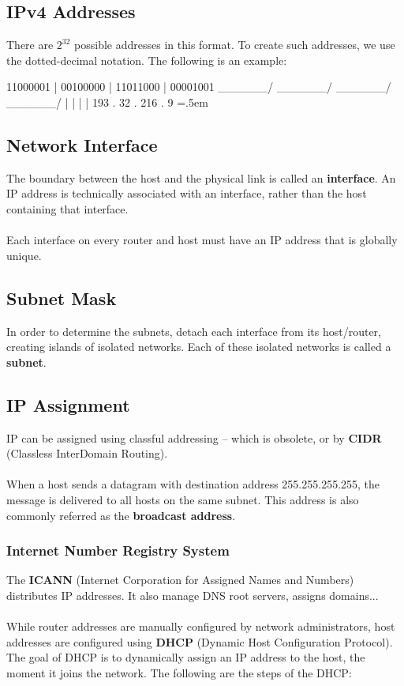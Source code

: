 \documentclass{article}
\newenvironment{cverbatim}
 {\SaveVerbatim{cverb}}
 {\endSaveVerbatim
  \flushleft\fboxrule=0pt\fboxsep=.5em
  \colorbox{cverbbg}{\BUseVerbatim{cverb}}%
  \endflushleft
}
\begin{document}
\subsection{IPv4 Addresses}
There are $2^{32}$ possible addresses in this format. To create such addresses, we use the dotted-decimal notation. The following is an example:

\begin{cverbatim}
11000001 | 00100000 | 11011000 | 00001001
\______/   \______/   \______/   \______/
   |          |          |          |
  193    .    32    .   216    .    9
\end{cverbatim}

\subsection{Network Interface}
The boundary between the host and the physical link is called an \textbf{interface}. An IP address is technically associated with an interface, rather than the host containing that interface. \\ \\
Each interface on every router and host must have an IP address that is globally unique.

\subsection{Subnet Mask}
In order to determine the subnets, detach each interface from its host/router, creating islands of isolated networks. Each of these isolated networks is called a \textbf{subnet}.

\subsection{IP Assignment}
IP can be assigned using classful addressing -- which is obsolete, or by \textbf{CIDR} (Classless InterDomain Routing). \\ \\
When a host sends a datagram with destination address 255.255.255.255, the message is delivered to all hosts on the same subnet. This address is also commonly referred as the \textbf{broadcast address}.

\subsubsection{Internet Number Registry System}
The \textbf{ICANN} (Internet Corporation for Assigned Names and Numbers) distributes IP addresses. It also manage DNS root servers, assigns domains... \\ \\
While router addresses are manually configured by network administrators, host addresses are configured using \textbf{DHCP} (Dynamic Host Configuration Protocol). The goal of DHCP is to dynamically assign an IP address to the host, the moment it joins the network. The following are the steps of the DHCP:
\end{document}
